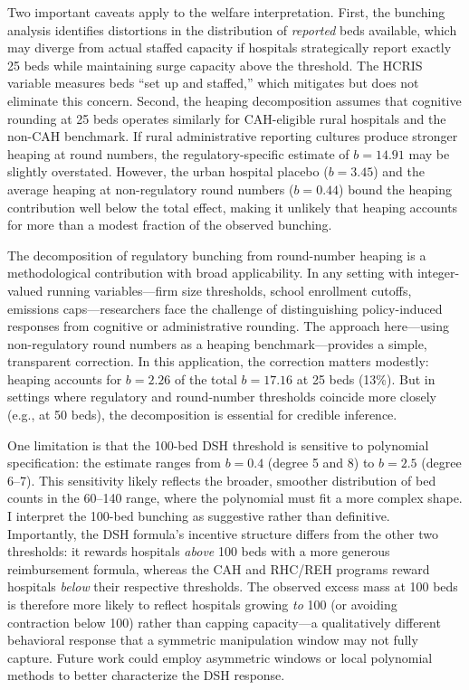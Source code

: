 \documentclass[12pt]{article}
\begin{document}
Two important caveats apply to the welfare interpretation. First, the bunching analysis identifies distortions in the distribution of \textit{reported} beds available, which may diverge from actual staffed capacity if hospitals strategically report exactly 25 beds while maintaining surge capacity above the threshold. The HCRIS variable measures beds ``set up and staffed,'' which mitigates but does not eliminate this concern. Second, the heaping decomposition assumes that cognitive rounding at 25 beds operates similarly for CAH-eligible rural hospitals and the non-CAH benchmark. If rural administrative reporting cultures produce stronger heaping at round numbers, the regulatory-specific estimate of $b = 14.91$ may be slightly overstated. However, the urban hospital placebo ($b = 3.45$) and the average heaping at non-regulatory round numbers ($b = 0.44$) bound the heaping contribution well below the total effect, making it unlikely that heaping accounts for more than a modest fraction of the observed bunching.

The decomposition of regulatory bunching from round-number heaping is a methodological contribution with broad applicability. In any setting with integer-valued running variables---firm size thresholds, school enrollment cutoffs, emissions caps---researchers face the challenge of distinguishing policy-induced responses from cognitive or administrative rounding. The approach here---using non-regulatory round numbers as a heaping benchmark---provides a simple, transparent correction. In this application, the correction matters modestly: heaping accounts for $b = 2.26$ of the total $b = 17.16$ at 25 beds (13\%). But in settings where regulatory and round-number thresholds coincide more closely (e.g., at 50 beds), the decomposition is essential for credible inference.

One limitation is that the 100-bed DSH threshold is sensitive to polynomial specification: the estimate ranges from $b = 0.4$ (degree 5 and 8) to $b = 2.5$ (degree 6--7). This sensitivity likely reflects the broader, smoother distribution of bed counts in the 60--140 range, where the polynomial must fit a more complex shape. I interpret the 100-bed bunching as suggestive rather than definitive. Importantly, the DSH formula's incentive structure differs from the other two thresholds: it rewards hospitals \textit{above} 100 beds with a more generous reimbursement formula, whereas the CAH and RHC/REH programs reward hospitals \textit{below} their respective thresholds. The observed excess mass at 100 beds is therefore more likely to reflect hospitals growing \textit{to} 100 (or avoiding contraction below 100) rather than capping capacity---a qualitatively different behavioral response that a symmetric manipulation window may not fully capture. Future work could employ asymmetric windows or local polynomial methods to better characterize the DSH response.
\end{document}
